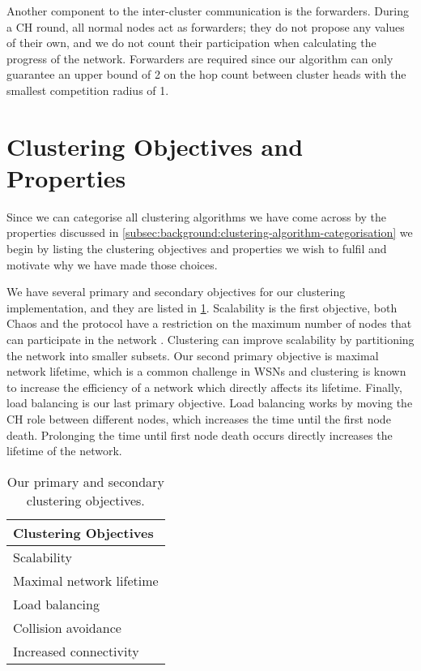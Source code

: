 Another component to the inter-cluster communication is the forwarders. During a CH round, all normal nodes act as forwarders; they do not propose any values of their own, and we do not count their participation when calculating the progress of the network. Forwarders are required since our algorithm can only guarantee an upper bound of 2 on the hop count between cluster heads with the smallest competition radius of 1.


\section{Clustering Objectives and Properties}
Since we can categorise all clustering algorithms we have come across by the properties discussed in \cref{subsec:background:clustering-algorithm-categorisation} we begin by listing the clustering objectives and properties we wish to fulfil and motivate why we have made those choices.


We have several primary and secondary objectives for our clustering implementation, and they are listed in \cref{fig:primary-and-secondary-objectives}. Scalability is the first objective, both Chaos and the \atwo{} protocol have a restriction on the maximum number of nodes that can participate in the network \cite{chaos-introduction-paper}. Clustering can improve scalability by partitioning the network into smaller subsets. Our second primary objective is maximal network lifetime, which is a common challenge in WSNs \cite{Afsar2014-clustering-survey, NikolaosA.Pantaziz2007-wsn-power-survey} and clustering is known to increase the efficiency of a network which directly affects its lifetime. Finally, load balancing is our last primary objective. Load balancing works by moving the CH role between different nodes, which increases the time until the first node death. Prolonging the time until first node death occurs directly increases the lifetime of the network.

\begin{table}[bt]
    \centering
    \caption{Our primary and secondary clustering objectives.}
    \begin{tabular}{l}
        \textbf{Clustering Objectives}    \\ \hline
        Scalability              \\
        Maximal network lifetime \\
        Load balancing           \\
        Collision avoidance      \\
        Increased connectivity  
    \end{tabular}
    \label{fig:primary-and-secondary-objectives}
\end{table}

